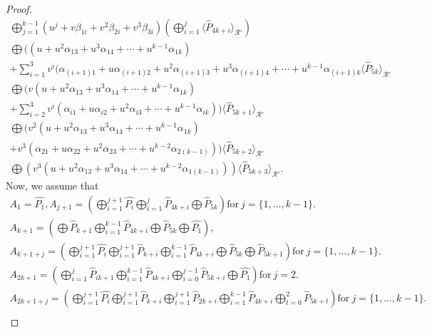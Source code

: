 \documentclass{amsart}
\theoremstyle{definition}
\theoremstyle{remark}
\numberwithin{equation}{section}
\begin{document}
\begin{proof}
\begin{gather*}
            \bigoplus_{j=1}^{k-1}  (u^j+ v\beta_{1i} + v^2\beta_{2i} + v^3\beta_{3i}) \left( \bigoplus_{i=1}^{j} \langle \hat{P}_{4k+i} \rangle_{\mathcal{R}'} \right)
            \\ \bigoplus  ((u + u^2\alpha_{13} + u^3\alpha_{14} + \cdots + u^{k-1}\alpha_{1k})
           \\ + \sum_{i=1}^{3} v^i( \alpha_{(i+1)1} + u\alpha_{(i+1)2} + u^2\alpha_{(i+1)3} + u^3\alpha_{(i+1)4} + \cdots + u^{k-1}\alpha_{(i+1)k} \langle \hat{P}_{5k} \rangle_{\mathcal{R}'} \\
           \bigoplus   (v(u + u^2\alpha_{13} + u^3\alpha_{14} + \cdots + u^{k-1}\alpha_{1k})
           \\ + \sum_{i=2}^{3} v^i( \alpha_{i1} + u\alpha_{i2} + u^2\alpha_{i3} +  \cdots + u^{k-1}\alpha_{ik} ))\langle \hat{P}_{5k+1} \rangle_{\mathcal{R}'} \\
           \bigoplus (v^2(u + u^2\alpha_{13} + u^3\alpha_{14} + \cdots + u^{k-1}\alpha_{1k})
     \\ + v^3( \alpha_{21} + u\alpha_{22} + u^2\alpha_{23} + \cdots + u^{k-2}\alpha_{2(k-1)})) \langle \hat{P}_{5k+2} \rangle_{\mathcal{R}'} \\
           \bigoplus  (v^3(u + u^2\alpha_{13} + u^3\alpha_{14} + \cdots + u^{k-2}\alpha_{1(k-1)})) \langle \hat{P}_{5k+3} \rangle_{\mathcal{R}'}.
           \end{gather*}
    Now, we assume that
    \allowdisplaybreaks
    \begin{gather*}
        A_1 = \hat{P_{1}}, A_{j+1} = \left( \bigoplus_{i=1}^{j+1}  \hat{P_i}  \bigoplus_{i=1}^{j}  \hat{P}_{4k+i}  \bigoplus  \hat{P}_{5k}   \right) \text{for} ~ j = \{1,\dots,k-1\}. \\
         A_{k+1} = \left( \bigoplus  \hat{P}_{k+1}  \bigoplus_{i=1}^{k-1}  \hat{P}_{4k+i}  \bigoplus  \hat{P}_{5k}  \bigoplus  \hat{P_{1}}   \right), \\
         A_{k+1+j} = \left( \bigoplus_{i=1}^{j+1}  \hat{P_{i}}  \bigoplus_{i=1}^{j+1}  \hat{P}_{k+i}  \bigoplus_{i=1}^{k-1}  \hat{P}_{4k+i}  \bigoplus  \hat{P}_{5k}  \bigoplus  \hat{P}_{5k+1}   \right) \text{for} ~ j = \{1,\dots,k-1\}.  \\
         A_{2k+1} =   \left( \bigoplus_{i=1}^{j}  \hat{P}_{ik+1}  \bigoplus_{i=1}^{k-1}  \hat{P}_{4k+i}  \bigoplus_{i=0}^{j-1}  \hat{P}_{5k+i}  \bigoplus  \hat{P_{1}}   \right) \text{for} ~ j =2. \\
         A_{2k+1+j} = \left( \bigoplus_{i=1}^{j+1}  \hat{P_{i}}  \bigoplus_{i=1}^{j+1}  \hat{P}_{k+i}   \bigoplus_{i=1}^{j+1}  \hat{P}_{2k+i} \bigoplus_{i=1}^{k-1}  \hat{P}_{4k+i}  \bigoplus_{t=0}^{2}  \hat{P}_{5k+t}    \right) \text{for} ~ j = \{1,\dots,k-1\}. \\

\end{gather*}
\end{proof}
\end{document}
